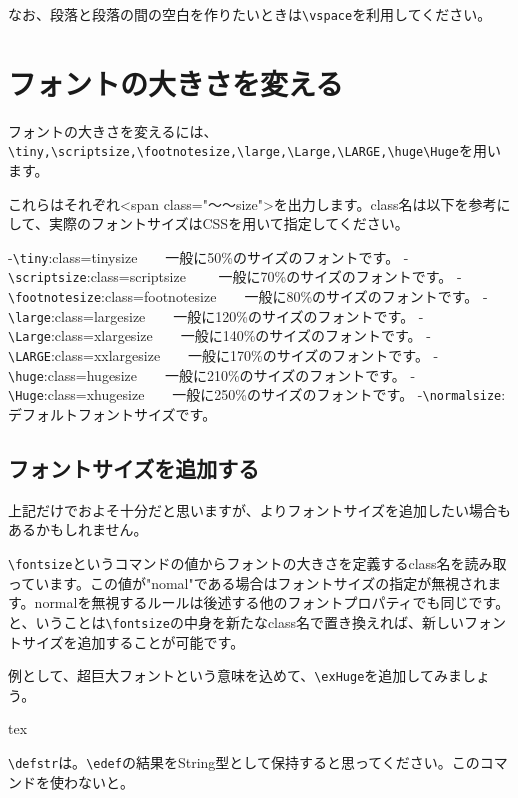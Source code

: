 なお、段落と段落の間の空白を作りたいときは\verb+\vspace+を利用してください。



\section{フォントの大きさを変える}
フォントの大きさを変えるには、\verb+\tiny,\scriptsize,\footnotesize,\large,\Large,\LARGE,\huge\Huge+を用います。

これらはそれぞれ<span class="～～size">を出力します。class名は以下を参考にして、実際のフォントサイズはCSSを用いて指定してください。

-\verb+\tiny+:class=tinysize　　一般に50\%のサイズのフォントです。
-\verb+\scriptsize+:class=scriptsize　　 一般に70\%のサイズのフォントです。
-\verb+\footnotesize+:class=footnotesize　　一般に80\%のサイズのフォントです。
-\verb+\large+:class=largesize　　一般に120\%のサイズのフォントです。
-\verb+\Large+:class=xlargesize　　一般に140\%のサイズのフォントです。
-\verb+\LARGE+:class=xxlargesize　　一般に170\%のサイズのフォントです。
-\verb+\huge+:class=hugesize　　一般に210\%のサイズのフォントです。
-\verb+\Huge+:class=xhugesize　　一般に250\%のサイズのフォントです。
-\verb+\normalsize+:デフォルトフォントサイズです。

\subsection{フォントサイズを追加する}
\label{sec:addfontsize}
上記だけでおよそ十分だと思いますが、よりフォントサイズを追加したい場合もあるかもしれません。

\verb+\fontsize+というコマンドの値からフォントの大きさを定義する{\color{\cred}class名}を読み取っています。この値が{\color{\cred}"nomal"}である場合はフォントサイズの指定が無視されます。normalを無視するルールは後述する他のフォントプロパティでも同じです。と、いうことは\verb+\fontsize+の中身を新たなclass名で置き換えれば、新しいフォントサイズを追加することが可能です。

例として、超巨大フォントという意味を込めて、\verb+\exHuge+を追加してみましょう。

\begin{code}{tex}
\newcommand{\exHuge}{\defstr\fontsize{exHugesize}}
\end{code}

{\color{red}\verb+\defstr+}は。\verb+\edef+の結果をString型として保持すると思ってください。このコマンドを使わないと。

